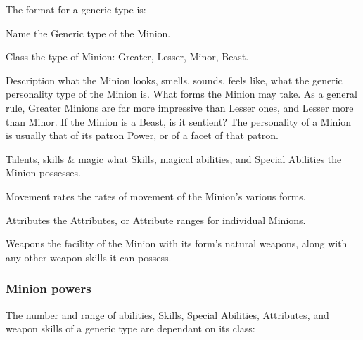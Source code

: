 The format for a generic type is:

\begin{Description}
\item[Name] the Generic type of the Minion.
\item[Class] the type of Minion: Greater, Lesser, Minor, Beast.
\item[Description] what the Minion looks, smells, sounds, feels like, what the generic personality type of the Minion is.  What forms the Minion may take.  As a general rule, Greater Minions are far more impressive than Lesser ones, and Lesser more than Minor.  If the Minion is a Beast, is it sentient?  The personality of a Minion is usually that of its patron Power, or of a facet of that patron.
\item[Talents, skills \& magic] what Skills, magical abilities, and Special Abilities the Minion possesses.
\item[Movement rates] the rates of movement of the Minion's various forms.
\item[Attributes] the Attributes, or Attribute ranges for individual Minions.
\item[Weapons] the facility of the Minion with its form's natural weapons, along with any other weapon skills it can possess.
\end{Description}

\subsubsection{Minion powers}

The number and range of abilities, Skills, Special Abilities, Attributes, and weapon skills of a generic type are dependant on its class:


